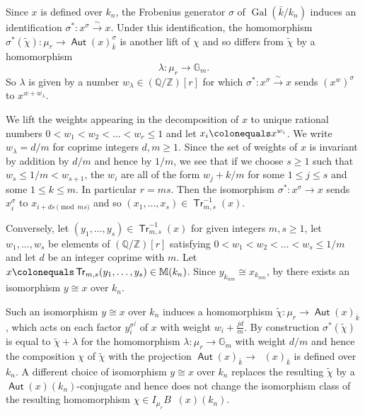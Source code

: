 \documentclass{article}
\def\isoto{\stackrel{\sim}{\longrightarrow}}
\DeclareMathOperator{\Gal}{Gal}
\DeclareMathOperator{\Aut}{\mathsf{Aut}}
\DeclareMathOperator{\uAut}{\underline{\mathsf{Aut}}}
\DeclareMathOperator{\Tr}{\mathsf{Tr}}
\newcommand{\BG}{{\mathbb{G}}}
\newcommand{\BM}{{\mathbb{M}}}
\newcommand{\BQ}{{\mathbb{Q}}}
\newcommand{\BZ}{{\mathbb{Z}}}
\newcommand{\defeq}{\colonequals}
\theoremstyle{definition}
\theoremstyle{plain}
\begin{document}
Since $x$ is defined over $k_n$, the Frobenius generator $\sigma$ of $\Gal(\bar k/ k_n)$ induces an identification $\sigma^*:x^\sigma \xrightarrow{\sim} x$. Under this identification, the homomorphism $\sigma^*(\tilde\chi)\colon \mu_r \to \Aut(x)^\sigma_{\bar k}$ is another lift of $\chi$ and so differs from $\tilde\chi$ by a homomorphism 
\begin{equation}\label{lll}\lambda\colon \mu_r \to \BG_m. \end{equation} So $\lambda$ is given by a number $w_\lambda \in (\BQ/\BZ)[r]$ for which $\sigma^*\colon x^\sigma \isoto x$ sends $(x^w)^\sigma$ to $x^{w+w_\lambda}$. 

We lift the weights appearing in the decomposition of $x$ to unique rational numbers $0 < w_1 < w_2 < \hdots < w_r \leq 1$ and let $x_i \defeq x^{w_i}$. We write $w_\lambda=d/m$ for coprime integers $d,m \geq 1$. Since the set of weights of $x$ is invariant by addition by $d/m$ and hence by $1/m$, we see that if we choose $s\geq 1$ such that $w_s \leq 1/m < w_{s+1}$, the $w_i$ are all of the form $w_j+k/m$ for some $1\leq j\leq s$ and some $1\leq k \leq m$. In particular $r=ms$. Then the isomorphism $\sigma^*\colon x^\sigma \to x$ sends $x_i^\sigma$ to $x_{i+ds \pmod {ms}}$ and so $(x_1,\hdots,x_s) \in \Tr_{m,s}^{-1}(x)$. 

Conversely, let $(y_1,\hdots,y_s) \in \Tr_{m,s}^{-1}(x)$ for given integers $m,s\geq 1$, let $w_1,\hdots,w_s$ be elements of $(\BQ/\BZ)[r]$ satisfying $0 < w_1 < w_2 < \hdots < w_s \leq 1/m$ and let $d$ be an integer coprime with $m$. Let $x \defeq \Tr_{m,s}(y_1,\hdots,y_s) \in \BM(k_n)$. Since $y_{k_{nm}}\cong x_{k_{nm}}$, by \cite[3.4]{Mo19} there exists an isomorphism $y\cong x$ over $k_n$. 


Such an isomorphism $y \cong x$ over $k_n$ induces a homomorphism $\tilde \chi\colon \mu_r \to \Aut(x)_{\bar k}$, which acts on each factor $y_i^{\sigma^j}$ of $x$ with weight $w_i+\frac{jd}{m}$. By construction $\sigma^*(\tilde\chi)$ is equal to $\tilde\chi+\lambda$ for the homomorphism $\lambda\colon \mu_r\to \BG_m$ with weight $d/m$ and hence the composition $\chi$ of $\tilde\chi$ with the projection $\Aut(x)_{\bar k} \to \uAut(x)_{\bar k}$ is defined over $k_n$. A different choice of isomorphism $y \cong x$ over $k_n$ replaces the resulting $\tilde\chi$ by a $\Aut(x)(k_n)$-conjugate and hence does not change the isomorphism class of the resulting homomorphism $\chi \in I_{\mu_r}B\uAut(x)(k_n)$.  
\end{document}
